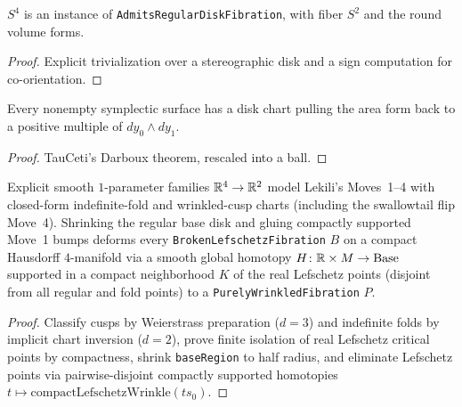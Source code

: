 \begin{lemma}
\label{lem_s4_instance}
\leanok
{}
$S^4$ is an instance of \texttt{AdmitsRegularDiskFibration}, with fiber $S^2$ and the round volume forms.
\end{lemma}
\begin{proof}\leanok
Explicit trivialization over a stereographic disk and a sign computation for co-orientation.
\end{proof}

\begin{lemma}
\label{lem_darboux}
\leanok
Every nonempty symplectic surface has a disk chart pulling the area form back to a positive
multiple of $dy_0\wedge dy_1$.
\end{lemma}
\begin{proof}\leanok
TauCeti's Darboux theorem, rescaled into a ball.
\end{proof}

\begin{theorem}
\label{thm_lekili_moves}
\leanok
{}
Explicit smooth $1$-parameter families $\mathbb{R}^4\to\mathbb{R}^2$ model Lekili's Moves~1--4 with closed-form
indefinite-fold and wrinkled-cusp charts (including the swallowtail flip Move~4). Shrinking the
regular base disk and gluing compactly supported Move~1 bumps deforms every
\texttt{BrokenLefschetzFibration} $B$ on a compact Hausdorff $4$-manifold via a smooth global
homotopy $H\colon\mathbb{R}\times M\to\mathrm{Base}$ supported in a compact neighborhood $K$ of the real
Lefschetz points (disjoint from all regular and fold points) to a \texttt{PurelyWrinkledFibration} $P$.
\end{theorem}
\begin{proof}\leanok
Classify cusps by Weierstrass preparation ($d=3$) and indefinite folds by implicit chart
inversion ($d=2$), prove finite isolation of real Lefschetz critical points by compactness, shrink
\texttt{baseRegion} to half radius, and eliminate Lefschetz points via pairwise-disjoint compactly
supported homotopies $t\mapsto\mathrm{compactLefschetzWrinkle}(t s_0)$.
\end{proof}

